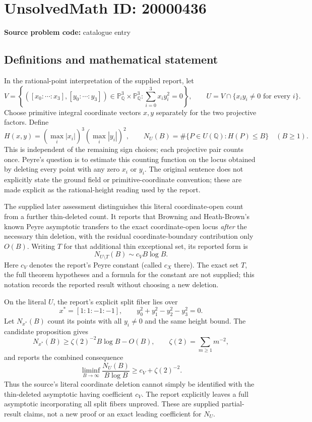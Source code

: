 \documentclass[11pt]{article}
\newcommand{\Q}{\mathbb{Q}}
\newcommand{\PP}{\mathbb{P}}
\begin{document}
\section*{UnsolvedMath ID: 20000436}
\textbf{Source problem code:} catalogue entry
\subsection{Definitions and mathematical statement}
In the rational-point interpretation of the supplied report, let
\[
 V=\left\{([x_0:\cdots:x_3],[y_0:\cdots:y_3])\in\PP^3_{\Q}\times\PP^3_{\Q}:
 \sum_{i=0}^3x_i y_i^2=0\right\},
 \qquad U=V\cap\{x_i y_i\ne0\text{ for every }i\}.
\]
Choose primitive integral coordinate vectors \(x,y\) separately for the two projective factors. Define
\[
 H(x,y)=\left(\max_i|x_i|\right)^3\left(\max_i|y_i|\right)^2,
 \qquad N_U(B)=\#\{P\in U(\Q):H(P)\le B\}\quad(B\ge1).
\]
This is independent of the remaining sign choices; each projective pair counts once. Peyre's question is to estimate this counting function on the locus obtained by deleting every point with any zero \(x_i\) or \(y_i\). The original sentence does not explicitly state the ground field or primitive-coordinate convention; these are made explicit as the rational-height reading used by the report.

The supplied later assessment distinguishes this literal coordinate-open count from a further thin-deleted count. It reports that Browning and Heath-Brown's known Peyre asymptotic transfers to the exact coordinate-open locus \emph{after} the necessary thin deletion, with the residual coordinate-boundary contribution only \(O(B)\). Writing \(T\) for that additional thin exceptional set, its reported form is
\[
 N_{U\setminus T}(B)\sim c_V B\log B.
\]
Here \(c_V\) denotes the report's Peyre constant (called \(c_X\) there). The exact set \(T\), the full theorem hypotheses and a formula for the constant are not supplied; this notation records the reported result without choosing a new deletion.

On the literal \(U\), the report's explicit split fiber lies over
\[
 x^*=[1:1:-1:-1],\qquad
 y_0^2+y_1^2-y_2^2-y_3^2=0.
\]
Let \(N_{x^*}(B)\) count its points with all \(y_i\ne0\) and the same height bound. The candidate proposition gives
\[
 N_{x^*}(B)\ge\zeta(2)^{-2}B\log B-O(B),\qquad
 \zeta(2)=\sum_{m\ge1}m^{-2},
\]
and reports the combined consequence
\[
 \liminf_{B\to\infty}\frac{N_U(B)}{B\log B}
 \ge c_V+\zeta(2)^{-2}.
\]
Thus the source's literal coordinate deletion cannot simply be identified with the thin-deleted asymptotic having coefficient \(c_V\). The report explicitly leaves a full asymptotic incorporating all split fibers unproved. These are supplied partial-result claims, not a new proof or an exact leading coefficient for \(N_U\).
\end{document}
